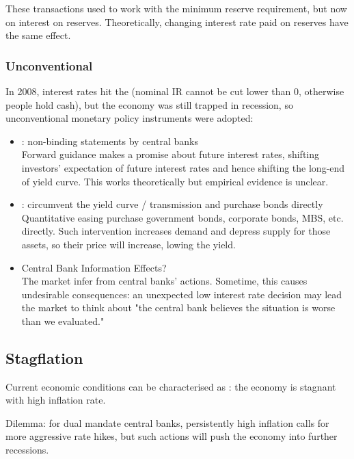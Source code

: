             These transactions used to work with the minimum reserve requirement, but now on interest on reserves. Theoretically, changing interest rate paid on reserves have the same effect.

        \subsubsection{Unconventional}
            In 2008, interest rates hit the  (nominal IR cannot be cut lower than 0, otherwise people hold cash), but the economy was still trapped in recession, so unconventional monetary policy instruments were adopted:
            \begin{itemize}
                \item {}: non-binding statements by central banks\\
                Forward guidance makes a promise about future interest rates, shifting investors' expectation of future interest rates and hence shifting the long-end of yield curve. This works theoretically but empirical evidence is unclear.
                \item {}: circumvent the yield curve / transmission and purchase bonds directly\\
                Quantitative easing purchase government bonds, corporate bonds, MBS, etc. directly. Such intervention increases demand and depress supply for those assets, so their price will increase, lowing the yield.
                \item Central Bank Information Effects?\\
                The market infer from central banks' actions. Sometime, this causes undesirable consequences: an unexpected low interest rate decision may lead the market to think about "the central bank believes the situation is worse than we evaluated."
            \end{itemize}
            
    \subsection{Stagflation}

        Current economic conditions can be characterised as : the economy is stagnant with high inflation rate.

        Dilemma: for dual mandate central banks, persistently high inflation calls for more aggressive rate hikes, but such actions will push the economy into further recessions.


